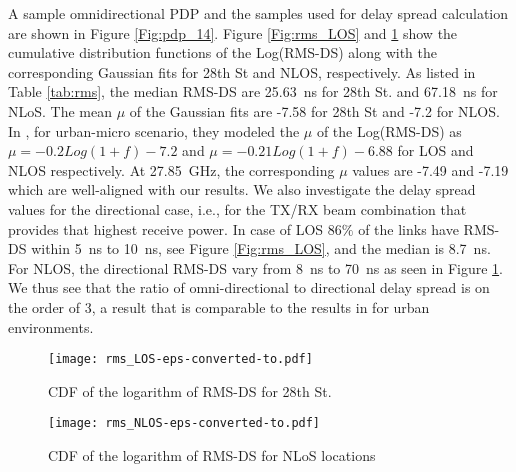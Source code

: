 \documentclass[conference]{IEEEtran}
\begin{document}
A sample omnidirectional PDP and the samples used for delay spread calculation are shown in Figure \ref{Fig:pdp_14}. Figure \ref{Fig:rms_LOS} and \ref{Fig:rms_NLOS}  show the cumulative distribution functions of the Log(RMS-DS) along with the corresponding Gaussian fits for 28th St and NLOS, respectively. As listed in Table \ref{tab:rms}, the median RMS-DS are \SI{25.63}{ns} for 28th St. and \SI{67.18}{ns} for NLoS. The mean $\mu$ of the Gaussian fits are -7.58 for 28th St and -7.2 for NLOS. In \cite{3GPP_5G_2016}, for urban-micro scenario, they modeled the $\mu$ of the Log(RMS-DS) as $\mu =-0.2Log(1+f)-7.2$ and $\mu =-0.21Log(1+f)-6.88$ for LOS and NLOS respectively. At \SI{27.85}{GHz}, the corresponding $\mu$ values are -7.49 and -7.19 which are well-aligned with our results. We also investigate the delay spread values for the directional case, i.e., for the TX/RX beam combination that provides that highest receive power. 
In case of LOS $86\%$ of the links have RMS-DS within \SI{5}{ns} to \SI{10}{ns}, see Figure \ref{Fig:rms_LOS}, and the median is \SI{8.7}{ns}. For NLOS, the directional RMS-DS vary from \SI{8}{ns} to \SI{70}{ns} as seen in Figure \ref{Fig:rms_NLOS}. We thus see that the ratio of omni-directional to directional delay spread is on the order of 3, a result that is comparable to the results in \cite{Rappaport_et_al_2015_TCom} for urban environments. 

\begin{figure}[tbp]\centering
\begin{minipage}{0.48\linewidth} \centering
    \texttt{[image: rms\_LOS-eps-converted-to.pdf]}\caption{CDF of the logarithm of RMS-DS for 28th St.}\label{Fig:rms_LOS}
\end{minipage} 
\begin{minipage}{0.03\linewidth} \centering
\end{minipage}
\begin{minipage}{0.48\linewidth} \centering
     \texttt{[image: rms\_NLOS-eps-converted-to.pdf]}\caption{CDF of the logarithm of RMS-DS for NLoS locations}\label{Fig:rms_NLOS}
  \end{minipage}
\end{figure}

% 
 
\end{document}
